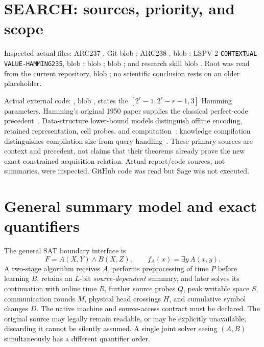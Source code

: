 \documentclass[10pt]{article}
\begin{document}
\section{SEARCH: sources, priority, and scope}
Inspected actual  files: ARC237 , Git blob \texttt{}; ARC238 , blob \texttt{}; LSPV-2 \texttt{CONTEXTUAL-VALUE-HAMMING235}, blob \texttt{};  blob \texttt{};  blob \texttt{}; and research skill blob \texttt{}. Root  was read from the current repository, blob \texttt{}; no scientific conclusion rests on an older placeholder.

Actual external code: , blob \texttt{}, states the $[2^r-1,2^r-r-1,3]$ Hamming parameters. Hamming's original 1950 paper supplies the classical perfect-code precedent~\cite{hamming}. Data-structure lower-bound models distinguish offline encoding, retained representation, cell probes, and computation~\cite{gal,fredman}; knowledge compilation distinguishes compilation size from query handling~\cite{darwiche}. These primary sources are context and precedent, not claims that their theorems already prove the new exact constrained acquisition relation. Actual report/code sources, not summaries, were inspected. GitHub code was read but Sage was not executed.

\section{General summary model and exact quantifiers}
The general SAT boundary interface is
\[
 F=A(X,Y)\land B(X,Z), \qquad f_A(x)=\exists y\,A(x,y).
\]
A two-stage algorithm receives $A$, performs preprocessing of time $P$ before learning $B$, retains an $L$-bit \emph{source-dependent} summary, and later solves its continuation with online time $R$, further source probes $Q$, peak writable space $S$, communication rounds $M$, physical head crossings $H$, and cumulative symbol changes $D$. The native machine and source-access contract must be declared. The original source may legally remain readable, or may be explicitly unavailable; discarding it cannot be silently assumed. A single joint solver seeing $(A,B)$ simultaneously has a different quantifier order.
\end{document}
